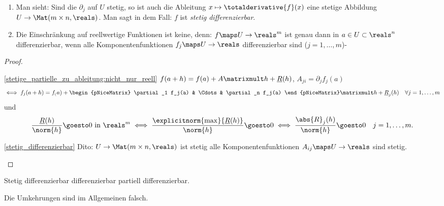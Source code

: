 \begin{bemerkungen}
    \begin{enumerate}
        \item \label{stetig_differenzierbar} Man sieht: Sind die \( \partial_j  \) auf \( U \) stetig, so ist auch die Ableitung \( x\mapsto \totalderivative{f}(x) \) eine stetige Abbildung \( U\to \Mat(m\times n, \reals) \). Man sagt in dem Fall: \( f \) ist \emph{stetig differenzierbar}.
        \item \label{stetige_partielle_zu_ableitung:nicht_nur_reell} Die Einschränkung auf reellwertige Funktionen ist keine, denn: \( f\maps U\to \reals^m \) ist genau dann in \( a\in U\subset \reals^n \) differenzierbar, wenn alle Komponentenfunktionen \( f_j\maps U\to \reals \) differenzierbar sind (\( j=1,\dotsc, m \))-
    \end{enumerate}
\end{bemerkungen}
\begin{proof}
    \begin{proofdescription}
        \item[\ref{stetige_partielle_zu_ableitung:nicht_nur_reell}] \( f(a+h)=f(a)+A\matrixmult h+\underline{R}(h) \), \( A_{ji}=\partial_j f_j(a) \) 
        \begin{equation*}
            \iff f_j(a+h)=f_(a)+\begin{pNiceMatrix} \partial_1 f_j(a) & \Cdots & \partial_n f_j(a) \end{pNiceMatrix}\matrixmult h+\underline{R}_j(h)\quad \forall j=1,\dotsc, m
        \end{equation*}
        und
        \begin{equation*}
            \frac{\underline{R}(h)}{\norm{h}}\goesto 0 \text{ in }\reals^m\iff \frac{\explicitnorm{\max}{\underline{R}(h)}}{\norm{h}}\goesto 0\iff \frac{\abs{R}_j(h)}{\norm{h}}\goesto 0\quad j=1,\dotsc,m.
        \end{equation*}
        \item[\ref{stetig_differenzierbar}] Dito: \( U\to \Mat(m\times n,\reals) \) ist stetig \tiff alle Komponentenfunktionen \( A_{ij}\maps U\to \reals \) sind stetig.
    \end{proofdescription}
    
\end{proof}
\begin{bemerkung*}
    Stetig differenzierbar \timplies differenzierbar \timplies partiell differenzierbar.

    Die Umkehrungen sind im Allgemeinen falsch.
\end{bemerkung*}
